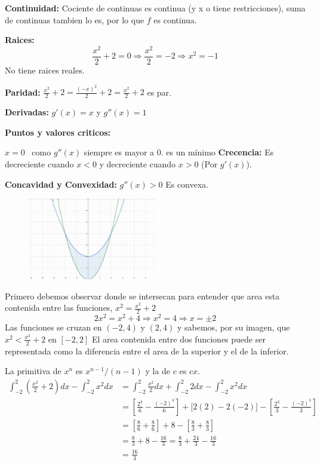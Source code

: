 \documentclass[12pt]{article}
\begin{document}
\begin{enumerate}[\hspace{9px} a)]
        \textbf{Continuidad: } Cociente de continuas es continua (y x o tiene restricciones), suma de continuas tambien lo es, por lo que $f$ es continua.\medskip

        \textbf{Raices: }
        \[\displaystyle\frac{x^2}{2}+2=0\Rightarrow\displaystyle\frac{x^2}{2}=-2\Rightarrow x^2=-1\]No tiene raices reales.\medskip

        \textbf{Paridad: }\quad \(\displaystyle\frac{x^2}{2}+2=\frac{(-x)^2}{2}+2 = \frac{x^2}{2}+2\) es par.\medskip

        \textbf{Derivadas: }\quad \(g'(x)=x\) y \(g''(x)=1\)\medskip

        \textbf{Puntos y valores criticos:}\medskip
        
        \(x=0\) \, como \(g''(x)\) siempre es mayor a 0. es un m\'inimo
        \textbf{Crecencia: } Es decreciente cuando \(x<0\) y decreciente cuando \(x>0\) (Por $g'(x)$).\medskip

        \textbf{Concavidad y Convexidad: }\(g''(x)>0\) Es convexa.\bigskip

        \begin{figure}[ht]
            \centering
            \includegraphics[width=0.5\textwidth]{7-a}
        \end{figure}
        
        Primero debemos observar donde se intersecan para entender que area esta contenida entre las funciones, \(x^2=\displaystyle\frac{x^2}{2}+2\)
        \[2x^2=x^2+4\Rightarrow x^2=4\Rightarrow x=\pm 2\]
        Las funciones se cruzan en \((-2,4)\) y \((2,4)\) y sabemos, por su imagen, que \(x^2<\displaystyle\frac{x^2}{2}+2\) en \([-2,2]\)\medskip
        El area contenida entre dos funciones puede ser representada como la diferencia entre el area de la superior y el de la inferior.\medskip

        La primitiva de \(x^n\) es \(x^{n-1}/(n-1)\) y la de \(c\) es \(cx\).
        \begin{align*}
            \int_{-2}^{2}\left(\frac{x^2}{2}+2\right)dx - \int_{-2}^{2}x^2dx&= \int_{-2}^{2}\frac{x^2}{2}dx + \int_{-2}^{2}2dx - \int_{-2}^{2}x^2dx\\
            &= \left[\frac{2^3}{6}-\frac{(-2)^3}{6}\right]+\big[2(2)-2(-2)\big]-\left[\frac{2^3}{3}-\frac{(-2)^3}{3}\right]\\
            &= \left[\frac{8}{6}+\frac{8}{6}\right]+8-\left[\frac{8}{3}+\frac{8}{3}\right]\\
            &= \frac{8}{3}+8-\frac{16}{3} = \frac{8}{3}+\frac{24}{3}-\frac{16}{3}\\
            &= \frac{16}{3}
        \end{align*}


\end{enumerate}
\end{document}
